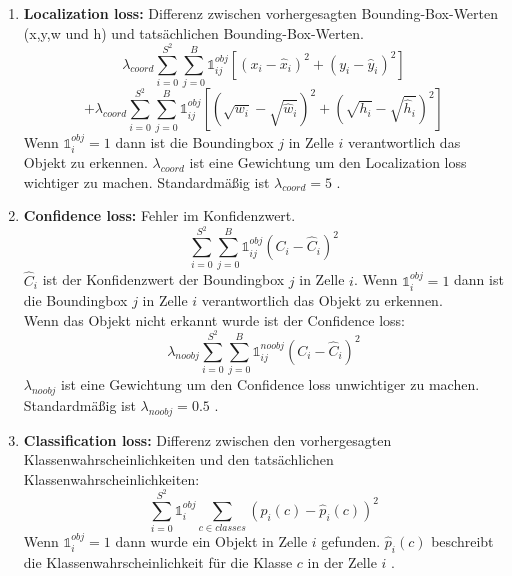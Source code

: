 \documentclass[conference]{IEEEtran}
\begin{document}
	\begin{enumerate}
		\item \textbf{Localization loss:} Differenz zwischen vorhergesagten Bounding-Box-Werten (x,y,w und h) und tatsächlichen Bounding-Box-Werten.
		\[ \lambda_{coord} \sum_{i=0}^{S^2}\sum_{j=0}^{B} \mathbb{1}_{i j}^{obj} [(x_i - \hat{x}_i )^2 + (y_i - \hat{y}_i )^2] \]
		\[ + \lambda_{coord} \sum_{i=0}^{S^2}\sum_{j=0}^{B} \mathbb{1}_{i j}^{obj} [(\sqrt{w_i} - \sqrt{\hat{w}_i} )^2 + (\sqrt{h_i} - \sqrt{\hat{h}_i} )^2] \]
		Wenn $\mathbb{1}_{i}^{obj} = 1$ dann ist die Boundingbox $j$ in Zelle $i$ verantwortlich das Objekt zu erkennen. $\lambda_{coord}$ ist eine Gewichtung um den Localization loss wichtiger zu machen. Standardmäßig ist $\lambda_{coord} = 5$ \cite{b5}.
		
		\item \textbf{Confidence loss:} Fehler im Konfidenzwert.
		\[  \sum_{i=0}^{S^2}\sum_{j=0}^{B} \mathbb{1}_{i j}^{obj} (C_i - \hat{C}_i)^2 \]
		$\hat{C}_i$ ist der Konfidenzwert der Boundingbox $j$ in Zelle $i$. Wenn $\mathbb{1}_{i}^{obj} = 1$ dann ist die Boundingbox $j$ in Zelle $i$ verantwortlich das Objekt zu erkennen.\\
		Wenn das Objekt nicht erkannt wurde ist der Confidence loss:
		\[  \lambda_{noobj} \sum_{i=0}^{S^2}\sum_{j=0}^{B} \mathbb{1}_{i j}^{noobj} (C_i - \hat{C}_i)^2 \]
		$\lambda_{noobj}$ ist eine Gewichtung um den Confidence loss unwichtiger zu machen. Standardmäßig ist $\lambda_{noobj} = 0.5$ \cite{b5}.
		
		\item \textbf{Classification loss:} Differenz zwischen den vorhergesagten Klassenwahrscheinlichkeiten und den tatsächlichen Klassenwahrscheinlichkeiten:
		\[ \sum_{i=0}^{S^2} \mathbb{1}_{i}^{obj} \sum_{c \in classes} (p_i(c) - \hat{p}_i(c))^2 \]
		Wenn $\mathbb{1}_{i}^{obj} = 1$ dann wurde ein Objekt in Zelle $i$ gefunden.
		$\hat{p}_i(c)$ beschreibt die Klassenwahrscheinlichkeit für die Klasse $c$ in der Zelle $i$ \cite{b5}.
	\end{enumerate}
\end{document}
